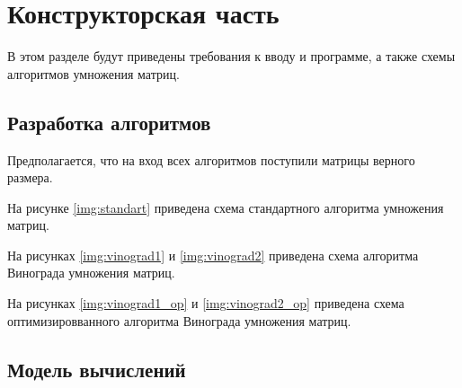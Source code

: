 \chapter{Конструкторская часть}
В этом разделе будут приведены требования к вводу и программе, а также схемы алгоритмов умножения матриц.

\section{Разработка алгоритмов}

Предполагается, что на вход всех алгоритмов поступили матрицы верного размера.

На рисунке \ref{img:standart} приведена схема стандартного алгоритма умножения матриц.

\clearpage

На рисунках \ref{img:vinograd1} и \ref{img:vinograd2} приведена схема алгоритма Винограда умножения матриц.

\clearpage
{}
\clearpage

На рисунках \ref{img:vinograd1_op} и \ref{img:vinograd2_op} приведена схема оптимизировванного алгоритма Винограда умножения матриц.

\clearpage
{}
\clearpage


\section{Модель вычислений}

